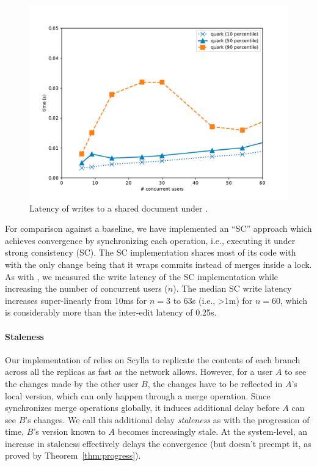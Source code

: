 \begin{figure}[ht]
  \centering
    \includegraphics[scale=0.4]{Figures/monkey_latency}
\caption{Latency of writes to a shared document under \quark. }
\label{fig:latency}
\end{figure}


For comparison against a baseline, we have implemented an ``SC''
approach which achieves convergence by synchronizing each operation,
i.e., executing it under strong consistency (SC). The SC
implementation shares most of its code with \quark with the only
change being that it wraps commits instead of merges inside a lock.
As with \quark, we measured the write latency of the SC implementation
while increasing the number of concurrent users ($n$).  The median SC
write latency increases super-linearly from 10ms for $n=3$ to 63s
(i.e., >1m) for $n=60$, which is considerably more than the inter-edit
latency of 0.25s.


\noindent\paragraph{Staleness} Our implementation of \quark relies on
Scylla to replicate the contents of each branch across all the
replicas as fast as the network allows. However, for a user $A$ to see
the changes made by the other user $B$, the changes have to be
reflected in $A$'s local version, which can only happen through a
merge operation. Since \quark synchronizes merge operations globally,
it induces additional delay before $A$ can see $B$'s changes. We call
this additional delay \emph{staleness} as with the progression of
time, $B$'s version known to $A$ becomes increasingly stale. At the
system-level, an increase in staleness effectively delays the
convergence (but doesn't preempt it, as proved by
Theorem~\ref{thm:progress}). 

